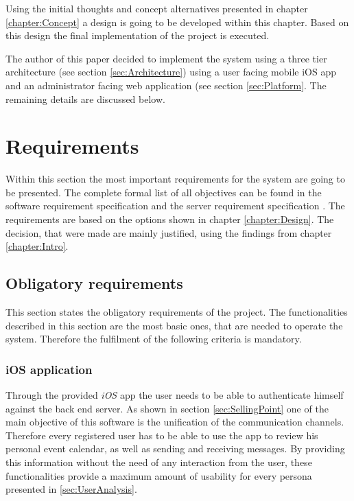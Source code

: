 Using the initial thoughts and concept alternatives presented in chapter \vref{chapter:Concept} a design is going to be developed within this chapter. Based on this design the final implementation of the project is executed.

The author of this paper decided to implement the system using a three tier architecture (see section \vref{sec:Architecture}) using a user facing mobile iOS app and an administrator facing web application (see section \vref{sec:Platform}. The remaining details are discussed below.

\section{Requirements}
\label{sec:Requirements}
Within this section the most important requirements for the system are going to be presented. The complete formal list of all objectives can be found in the software requirement specification \cite{Steiler:2014aa} and the server requirement specification \cite{Steiler:2014ab}. The requirements are based on the options shown in chapter \vref{chapter:Design}. The decision, that were made are mainly justified, using the findings from chapter \vref{chapter:Intro}.

\subsection{Obligatory requirements} %
\label{sec:ObligatoryReq}

This section states the obligatory requirements of the project. The functionalities described in this section are the most basic ones, that are needed to operate the system. Therefore the fulfilment of the following criteria is mandatory.

\subsubsection{iOS application}

Through the provided \emph{iOS} app the user needs to be able to authenticate himself against the back end server. As shown in section \vref{sec:SellingPoint} one of the main objective of this software is the unification of the communication channels. Therefore every registered user has to be able to use the app to review his personal event calendar, as well as sending and receiving messages. By providing this information without the need of any interaction from the user, these functionalities provide a maximum amount of usability for every persona presented in \vref{sec:UserAnalysis}. 

